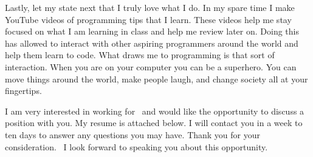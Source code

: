 \documentclass{my_cv}
\begin{document}
Lastly, let my state next that I truly love what I do.  In my spare time
I make YouTube videos of programming tips that I learn.  These videos
help me stay focused on what I am learning in class and help me review
later on.  Doing this has allowed to interact with other aspiring
programmers around the world and help them learn to code.  What draws me
to programming is that sort of interaction.  When you are on your
computer you can be a superhero.  You can move things around the world,
make people laugh, and change society all at your fingertips.

I am very interested in working for \companyName \ and would like the
opportunity to discuss a position with you.  My resume is attached
below.  I will contact you in a week to ten days to answer any questions
you may have. Thank you for your consideration.   I look forward to
speaking you about this opportunity. 

\makeletterclosing
\end{document}
